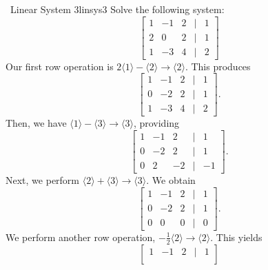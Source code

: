     \pagebreak
    \begin{example}{\Difficulty\,\Difficulty\,\,Linear System 3}{linsys3}
        Solve the following system:
        \begin{equation*}
            \begin{bmatrix}
                 1 & -1 & 2 & | & 1 \\
                 2 & 0 & 2 & | & 1 \\
                 1 & -3 & 4 & | & 2
            \end{bmatrix}
        \end{equation*}
        Our first row operation is \(2\langle1\rangle-\langle2\rangle\to\langle2\rangle\). This produces
        \begin{equation*}
            \begin{bmatrix}
                 1 & -1 & 2 & | & 1 \\
                 0 & -2 & 2 & | & 1 \\
                 1 & -3 & 4 & | & 2
            \end{bmatrix}.
        \end{equation*}
        Then, we have \(\langle1\rangle-\langle3\rangle\to\langle3\rangle\), providing
        \begin{equation*}
            \begin{bmatrix}
                 1 & -1 & 2 & | & 1 \\
                 0 & -2 & 2 & | & 1 \\
                 0 & 2 & -2 & | & -1
            \end{bmatrix}.
        \end{equation*}
        Next, we perform \(\langle2\rangle+\langle3\rangle\to\langle3\rangle\). We obtain
        \begin{equation*}
            \begin{bmatrix}
                 1 & -1 & 2 & | & 1 \\
                 0 & -2 & 2 & | & 1 \\
                 0 & 0 & 0 & | & 0
            \end{bmatrix}.
        \end{equation*}
        We perform another row operation, \(-\frac{1}{2}\langle 2\rangle\to\langle 2\rangle\). This yields
        \begin{equation*}
            \begin{bmatrix}
                 1 & -1 & 2 & | & 1 \\

\end{bmatrix}
\end{equation*}
\end{example}
